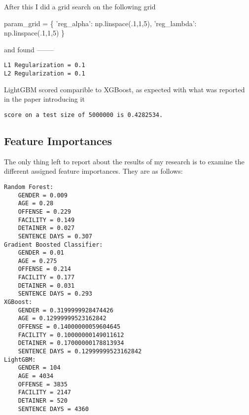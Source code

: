 \documentclass[11pt]{article}
\newenvironment{Shaded}{}{}
\newcommand{\DecValTok}[1]{\textcolor[rgb]{0.25,0.63,0.44}{{#1}}}
\newcommand{\StringTok}[1]{\textcolor[rgb]{0.25,0.44,0.63}{{#1}}}
\newcommand{\NormalTok}[1]{{#1}}
\newcommand{\OperatorTok}[1]{\textcolor[rgb]{0.40,0.40,0.40}{{#1}}}
\begin{document}
After this I did a grid search on the following grid

\begin{Shaded}
\begin{Highlighting}[]
\NormalTok{param_grid }\OperatorTok{=}\NormalTok{ \{}
    \StringTok{'reg_alpha'}\NormalTok{: np.linspace(.}\DecValTok{1}\NormalTok{,}\DecValTok{1}\NormalTok{,}\DecValTok{5}\NormalTok{),}
    \StringTok{'reg_lambda'}\NormalTok{: np.linspace(.}\DecValTok{1}\NormalTok{,}\DecValTok{1}\NormalTok{,}\DecValTok{5}\NormalTok{)}
\NormalTok{\}}
\end{Highlighting}
\end{Shaded}

and found --------

    \begin{Verbatim}[commandchars=\\\{\}]
L1 Regularization = 0.1
L2 Regularization = 0.1

    \end{Verbatim}

    LightGBM scored comparible to XGBoost, as expected with what was
reported in the paper introducing it

    \begin{Verbatim}[commandchars=\\\{\}]
score on a test size of 5000000 is 0.4282534.

    \end{Verbatim}

    \hypertarget{feature-importances}{%
\subsection{Feature Importances}\label{feature-importances}}

The only thing left to report about the results of my research is to
examine the different assigned feature importances. They are as follows:

    \begin{Verbatim}[commandchars=\\\{\}]
Random Forest:
	GENDER = 0.009
	AGE = 0.28
	OFFENSE = 0.229
	FACILITY = 0.149
	DETAINER = 0.027
	SENTENCE DAYS = 0.307
Gradient Boosted Classifier:
	GENDER = 0.01
	AGE = 0.275
	OFFENSE = 0.214
	FACILITY = 0.177
	DETAINER = 0.031
	SENTENCE DAYS = 0.293
XGBoost:
	GENDER = 0.3199999928474426
	AGE = 0.12999999523162842
	OFFENSE = 0.14000000059604645
	FACILITY = 0.10000000149011612
	DETAINER = 0.17000000178813934
	SENTENCE DAYS = 0.12999999523162842
LightGBM:
	GENDER = 104
	AGE = 4034
	OFFENSE = 3835
	FACILITY = 2147
	DETAINER = 520
	SENTENCE DAYS = 4360

    \end{Verbatim}
\end{document}
